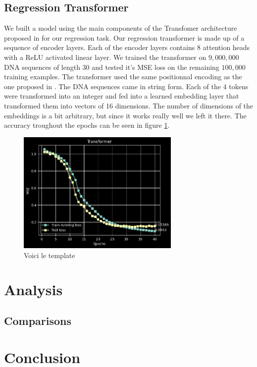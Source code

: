 \documentclass{article}
\begin{document}
\subsection{Regression Transformer}
We built a model using the main components of the Transfomer architecture proposed in \cite{transformers} for our regression task. Our regression transformer is made up of a sequence of encoder layers. Each of the encoder layers contains 8 attention heads with a ReLU activated linear layer. We trained the transformer on $9 ,000, 000$ DNA sequences of length $30$ and tested it's MSE loss on the remaining $100,000$ training examples. The transformer used the same positionnal encoding as the one proposed in \cite{transformers}. The DNA sequences came in string form. Each of the 4 tokens were transformed into an integer and fed into a learned embedding layer that transformed them into vectors of 16 dimensions. The number of dimensions of the embeddings is a bit arbitrary, but since it works really well we left it there. The accuracy troughout the epochs can be seen in figure \ref{fig:transformer_accuracy}. 

\begin{figure} \label{fig:transformer_accuracy}
    \caption{Voici le template} \center
    \includegraphics[width=0.7\textwidth]{images/2023-04-02-13-48-49.png}
\end{figure}

\section{Analysis}


\subsection{Comparisons}

\section{Conclusion}



\end{document}
